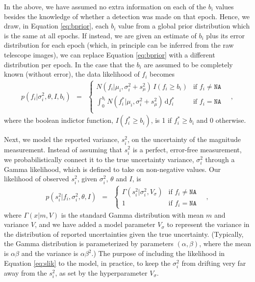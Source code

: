 \documentclass[12pt,preprint]{aastex}
\newcommand{\dd}{\mathrm{d}}
\newcommand{\fobs}{f_i}
\newcommand{\sobs}{s^2_i}
\newcommand{\ftrue}{f_i^*}
\begin{document}
In the above, we have assumed no extra information on each of the $b_i$ values besides the knowledge of whether a detection was made on that epoch.  Hence, we draw, in Equation \ref{eq:bprior}, each $b_i$ value from a global prior distribution which is the same at all epochs.  If instead, we are given an estimate of $b_i$ plus its error distribution for each epoch (which, in principle can be inferred from the raw telescope images), we can replace Equation \ref{eq:bprior} with a different distribution per epoch.  In the case that the $b_i$ are assumed to be completely known (without error), the data likelihood of $\fobs$ becomes
\begin{eqnarray}\displaystyle
p(\fobs |\sigma^2_i,\theta,I, b_i) &=& \left\{\begin{array}{ll}
  N(\fobs | \mu_i,  \sigma^2_i + s^2_{\mu})\,  I(\fobs \ge b_i) & \mbox{if $\fobs \ne \texttt{NA}$} \\
 \int_{0}^{b_i} N(\ftrue | \mu_i, \sigma_i^2 + s^2_{\mu})\, \dd \ftrue & \mbox{if $\fobs = \texttt{NA}$} \\
\end{array}\right.\label{eq:mlik_s}
\quad ,
\end{eqnarray}
where the boolean indictor function, $I(\ftrue \ge b_i)$, is 1 if $\ftrue \ge b_i$ and 0 otherwise.

Next, we model the reported variance, $\sobs$, on the uncertainty of the magnitude measurement.  Instead of assuming that $\sobs$ is a perfect, error-free measurement, we probabilistically connect it to the true uncertainty variance, $\sigma^2_i$ through a Gamma likelihood, which is defined to take on non-negative values.  Our likelihood of observed $\sobs$, given $\sigma^2_i$, $\theta$ and $I$, is
\begin{eqnarray}\displaystyle
p(\sobs | \fobs, \sigma^2_i, \theta,I) &=& \left\{\begin{array}{ll}
  \Gamma (\sobs | \sigma^2_i, V_{\sigma} ) & \mbox{if $\fobs \ne \texttt{NA}$} \\
 1& \mbox{if $\fobs = \texttt{NA}$}
\end{array}\right.\label{eq:slik}
\quad ,
\end{eqnarray}
where $\Gamma(x | m, V)$ is the standard Gamma distribution with mean $m$ and variance $V$, 
and we have added a model parameter $V_\sigma$ to represent the
variance in the distribution of reported uncertainties given the true
uncertainty.  (Typically, the Gamma distribution is parameterized by parameters $(\alpha, \beta)$, where the mean is $\alpha\beta$ and the variance is $\alpha\beta^2$.)  The  purpose of 
 including the likelihood in Equation \ref{eq:slik} to the model, in practice, to keep the $\sigma^2_i$ from
drifting very far away from the $s^2_i$, as set by the hyperparameter
$V_\sigma$.
\end{document}
